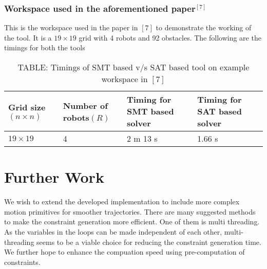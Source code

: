 \documentclass{article}[11pt]
\begin{document}
			\subsubsection{Workspace used in the aforementioned paper$^{[7]}$}
			This is the workspace used in the paper in $[7]$ to demonstrate the working of the tool. It is a $19 \times 19$ grid with 4 robots and 92 obstacles. The following are the timings for both the tools
				\begin{table}[h!]
				\centering
				\begin{tabular}{|| p{2cm} | p{2cm} | p{2cm} | p{2cm} ||} 
				 \hline\hline
				 Grid size$(n \times n)$ & Number of robots$(R)$ & Timing for SMT based solver & Timing for SAT based solver \\ [0.5ex] 
				 \hline\hline
				 $19 \times 19$ & 4 & 2 m 13 s & 1.66 s  \\ [1ex]
				 \hline
				\end{tabular}
				\caption*{TABLE: Timings of SMT based v/s SAT based tool on example workspace in $[7]$}
				\end{table}


	\section{Further Work}
		We wish to extend the developed implementation to include more complex motion primitives for smoother trajectories.
		There are many suggested methods to make the constraint generation more efficient. One of them is multi threading. As the variables in the loops can be made independent of each other, multi-threading seems to be a viable choice for reducing the constraint generation time. 
		We further hope to enhance the compuation speed using pre-computation of constraints.
\end{document}
